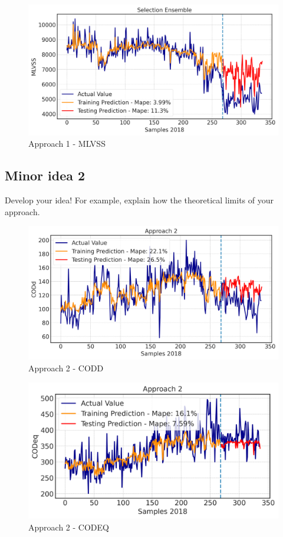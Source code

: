 \begin{figure}[h]
\centering
\includegraphics[width=\linewidth]{figures/test.png}
\caption{Approach 1 - MLVSS}
\label{f:App1-MLVSS}
\end{figure}

\subsection{Minor idea 2}
\label{s:Contribution-2-Major-1-Minor-2}
Develop your idea! For example, explain how the theoretical limits of your approach.

\begin{figure}[h]
\centering
\includegraphics[width=\linewidth]{figures/Ch6/CODd-2.png}
\caption{Approach 2 - CODD}
\label{f:App2-codd}
\end{figure}

\begin{figure}[h]
\centering
\includegraphics[width=\linewidth]{figures/Ch6/CODeq-2.png}
\caption{Approach 2 - CODEQ}
\label{f:App2-codeq}
\end{figure}

